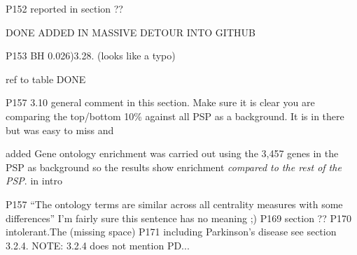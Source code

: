 P152 reported in section ??

DONE ADDED IN MASSIVE DETOUR INTO GITHUB

P153 BH 0.026)3.28. (looks like a typo)

ref to table DONE

P157 3.10 general comment in this section. Make sure it is clear you are comparing the top/bottom 10\% against all PSP as a background. It is in there but was easy to miss and

added Gene ontology enrichment was carried out using the 3,457 genes in the PSP as background so the results show enrichment \textit{compared to the rest of the PSP}. in intro

P157 “The ontology terms are similar across all centrality measures with some differences” I’m fairly sure this sentence has no meaning ;)
P169 section ??
P170 intolerant.The (missing space)
P171 including Parkinson’s disease see section 3.2.4. NOTE: 3.2.4 does not mention PD...
